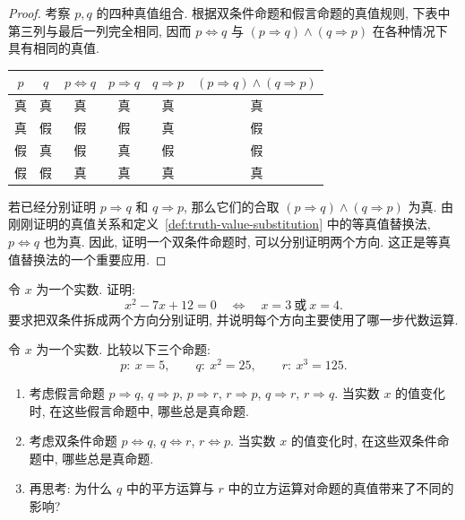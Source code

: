 \documentclass[usesamecnt, thmcnt=section, lang=cn, newtx, 10pt, scheme=chinese]{elegantbook}
\begin{document}
\begin{proof}
考察 $p,q$ 的四种真值组合. 根据双条件命题和假言命题的真值规则, 下表中第三列与最后一列完全相同, 因而 $p\Leftrightarrow q$ 与 $(p\Rightarrow q)\wedge(q\Rightarrow p)$ 在各种情况下具有相同的真值.
\begin{table}[H]
\centering
\begin{tabular}{|c|c|c|c|c|c|}
\hline
$p$ & $q$ & $p\Leftrightarrow q$ & $p\Rightarrow q$ & $q\Rightarrow p$ & $(p\Rightarrow q)\wedge(q\Rightarrow p)$\\
\hline
真 & 真 & 真 & 真 & 真 & 真\\
真 & 假 & 假 & 假 & 真 & 假\\
假 & 真 & 假 & 真 & 假 & 假\\
假 & 假 & 真 & 真 & 真 & 真\\
\hline
\end{tabular}
\end{table}


若已经分别证明 $p\Rightarrow q$ 和 $q\Rightarrow p$, 那么它们的合取 $(p\Rightarrow q)\wedge(q\Rightarrow p)$ 为真. 由刚刚证明的真值关系和定义~\ref{def:truth-value-substitution} 中的等真值替换法, $p\Leftrightarrow q$ 也为真. 因此, 证明一个双条件命题时, 可以分别证明两个方向. 这正是等真值替换法的一个重要应用.
\end{proof}

\begin{exercise}
\label{ex:logic-13}
令 $x$ 为一个实数. 证明:
\[
 x^2-7x+12=0
 \quad\Leftrightarrow\quad
 x=3\ \text{或}\ x=4.
\]
要求把双条件拆成两个方向分别证明, 并说明每个方向主要使用了哪一步代数运算.
\end{exercise}

\begin{challenge}
\label{ch:logic-03}
令 $x$ 为一个实数. 比较以下三个命题:
\[
 p:\ x=5,
 \qquad
 q:\ x^2=25,
 \qquad
 r:\ x^3=125.
\]
\begin{enumerate}[label=\rm(\arabic*)]
\item 考虑假言命题 $p\Rightarrow q$, $q\Rightarrow p$, $p\Rightarrow r$, $r\Rightarrow p$, $q\Rightarrow r$, $r\Rightarrow q$. 当实数 $x$ 的值变化时, 在这些假言命题中, 哪些总是真命题.

\item 考虑双条件命题 $p\Leftrightarrow q$, $q\Leftrightarrow r$, $r\Leftrightarrow p$. 当实数 $x$ 的值变化时, 在这些双条件命题中, 哪些总是真命题.

\item 再思考: 为什么 $q$ 中的平方运算与 $r$ 中的立方运算对命题的真值带来了不同的影响?
\end{enumerate}
\end{challenge}
\end{document}
